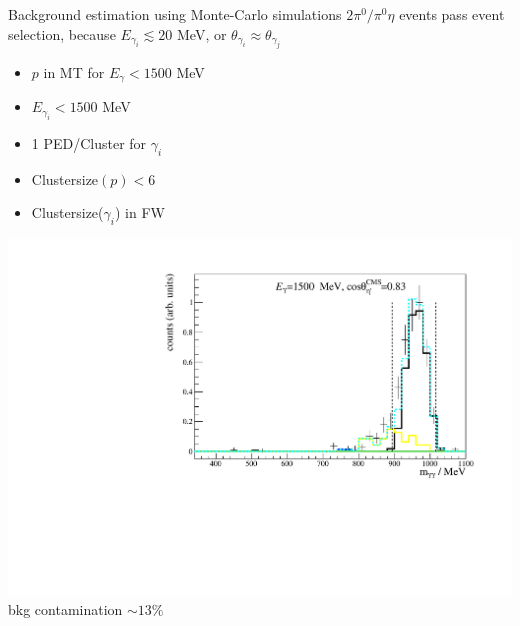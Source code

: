 \documentclass[11pt,aspectratio=169,dvipsnames]{beamer}
\newcommand{\thecolor}{black!70!blue}
\begin{document}
\begin{frame}{Background estimation using Monte-Carlo simulations}
	$2\pi^0/\pi^0\eta$ events pass event selection, because $E_{\gamma_{i}}\lesssim 20$ MeV, or $\theta_{\gamma_{i}}\approx\theta_{\gamma_{j}}$ 
	\begin{minipage}{.4\linewidth}
			\begin{tcolorbox}[colback=blue!5,colframe=\thecolor,title={Background reducing cuts}]
				\begin{itemize}
					\item $p$ in MT for $E_\gamma<1500$ MeV
					\item $E_{\gamma_{i}}<1500$ MeV
					\item 1 PED/Cluster for $\gamma_i$
					\item Clustersize$(p)<6$
					\item Clustersize($\gamma_{i}$) in FW
				\end{itemize}
			\end{tcolorbox}
		\end{minipage}
		\begin{minipage}{.59\linewidth}
			\centering
			\includegraphics[width=\linewidth]{inv_mass_bin_cuts}\\
			bkg contamination $\sim 13\%$
		\end{minipage}
		
	\end{frame}
\end{document}
